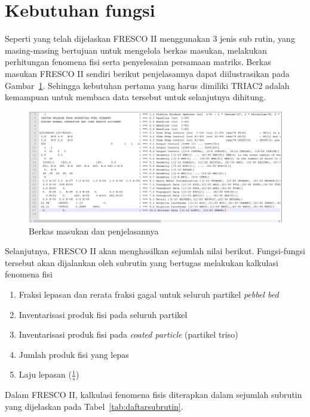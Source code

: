 \documentclass[a4paper,11pt]{report}
\renewcommand{\figurename}{Gambar}
\renewcommand{\tablename}{Tabel}
\begin{document}
\section{Kebutuhan fungsi}
Seperti yang telah dijelaskan FRESCO II menggunakan 3 jenis sub rutin, yang masing-masing bertujuan untuk mengelola berkas masukan, melakukan perhitungan fenomena fisi serta penyelesaian persamaan matriks. Berkas masukan FRESCO II sendiri berikut penjelasannya dapat diilustrasikan pada \figurename~\ref{fig:fileinput}. Sehingga kebutuhan pertama yang harus dimiliki TRIAC2 adalah kemampuan untuk membaca data tersebut untuk selanjutnya dihitung.

\begin{figure}[h!]
  \begin{center}
    \includegraphics[scale=.25]{pics/inputFresco.png}
    \caption{Berkas masukan dan penjelasannya}
    \label{fig:fileinput}
  \end{center}
\end{figure}

Selanjutnya, FRESCO II akan menghasilkan sejumlah nilai berikut. Fungsi-fungsi tersebut akan dijalankan oleh subrutin yang bertugas melakukan kalkulasi fenomena fisi
\begin{enumerate}
  \item Fraksi lepasan dan rerata fraksi gagal untuk seluruh partikel \textit{pebbel bed}
  \item Inventarisasi produk fisi pada seluruh partikel
  \item Inventarisasi produk fisi pada \textit{coated particle} (partikel triso)
  \item Jumlah produk fisi yang lepas
  \item Laju lepasan ($\frac{1}{s}$)
\end{enumerate}

Dalam FRESCO II, kalkulasi fenomena fisis diterapkan dalam sejumlah subrutin yang dijelaskan pada \tablename~\ref{tab:daftarsubrutin}.
\end{document}
